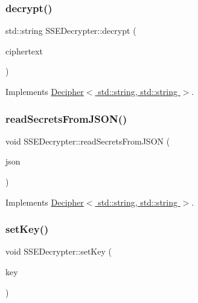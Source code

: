 \mbox{\label{classSSEDecrypter_afc1522b78aed502f8ca94163fc030ffa}} 
\subsubsection{\texorpdfstring{decrypt()}{decrypt()}}
{\footnotesize\ttfamily std\+::string S\+S\+E\+Decrypter\+::decrypt (\begin{DoxyParamCaption}\item[{std\+::string \&}]{ciphertext }\end{DoxyParamCaption})\hspace{0.3cm}{\ttfamily [virtual]}}



Implements \hyperlink{classDecipher_ac6b8c369eda2d7e17fa90cb594cf41b6}{Decipher$<$ std\+::string, std\+::string $>$}.

\mbox{\label{classSSEDecrypter_a1bdc685b8ea9c5bcc2b29f0c9a3ca7bf}} 
\subsubsection{\texorpdfstring{read\+Secrets\+From\+J\+S\+O\+N()}{readSecretsFromJSON()}}
{\footnotesize\ttfamily void S\+S\+E\+Decrypter\+::read\+Secrets\+From\+J\+S\+ON (\begin{DoxyParamCaption}\item[{std\+::string \&}]{json }\end{DoxyParamCaption})\hspace{0.3cm}{\ttfamily [virtual]}}



Implements \hyperlink{classDecipher_a39aea002012130201e12a8fa7d84dda5}{Decipher$<$ std\+::string, std\+::string $>$}.

\mbox{\label{classSSEDecrypter_afb19d398b4862298a831a020d61ffef7}} 
\subsubsection{\texorpdfstring{set\+Key()}{setKey()}\hspace{0.1cm}{\footnotesize\ttfamily [1/2]}}
{\footnotesize\ttfamily void S\+S\+E\+Decrypter\+::set\+Key (\begin{DoxyParamCaption}\item[{Crypto\+P\+P\+::\+Sec\+Byte\+Block \&}]{key }\end{DoxyParamCaption})}

